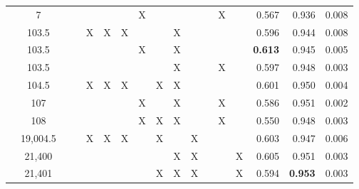 \documentclass[11pt,a4paper]{article}
\begin{document}
\begin{table*}[t]
\begin{center}
\begin{tabular}{|l|S[table-format=6.1]|r|r||c|c|c|c|c|c|c|c|c|c||r|rr|}
    &   7 &  &  &  &  &   & X &   &   &  &  & X & & 0.567 & 0.936 & 0.008  \\
    & 103.5  &  &   & X  & X & X  &  &  & X &  &  &  &  & 0.596  & 0.944 & 0.008   \\
    & 103.5 &   &    &  &  &   & X &   & X &  &  &  & & \textbf{0.613} & 0.945 & 0.005  \\
    & 103.5    &   &     &  &  &   &  &   & X &  &  & X &  & 0.597 & 0.948 & 0.003  \\
    & 104.5 &  &   & X  & X & X  &  & X  & X &  &  &  &  & 0.601  & 0.950 & 0.004   \\
    & 107 &   &    &  &  &   & X &   & X &  &  & X & & 0.586 & 0.951 & 0.002  \\
    & 108 &   &    &  &  &   & X & X & X &  &  & X & & 0.550 & 0.948 & 0.003  \\
    & 19,004.5  &  &   & X  & X & X  &  & X  &  & X &  &  &  & 0.603  & 0.947 & 0.006   \\
    & 21,400 &   &     &  &  &   &  &   & X & X  &  &  & X & 0.605 & 0.951 & 0.003  \\
    & 21,401 &   &     &  &  &   &  & X  & X & X  &  &  & X & 0.594 & \textbf{0.953} & 0.003  \\

\end{tabular}
\end{center}
\end{table*}
\end{document}
